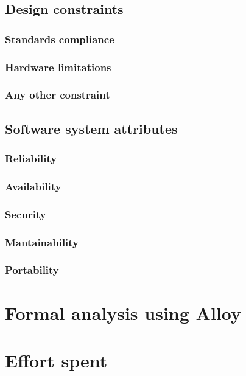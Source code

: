\documentclass[12pt]{article}
\begin{document}
  \subsection{Design constraints}
    \subsubsection{Standards compliance}
    \subsubsection{Hardware limitations}
    \subsubsection{Any other constraint}
  \subsection{Software system attributes}
    \subsubsection{Reliability}
    \subsubsection{Availability}
    \subsubsection{Security}
    \subsubsection{Mantainability}
    \subsubsection{Portability}

\clearpage
\section{Formal analysis using Alloy}
\label{sec:alloy}

\clearpage
\section{Effort spent}
\label{sec:effort}
\end{document}
